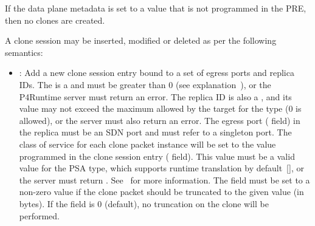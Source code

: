 \documentclass[11pt]{article}
\begin{document}
{%
If the  data plane metadata is set to a value that is not
programmed in the PRE, then no clones are created.%

A clone session may be inserted, modified or deleted as per the following
semantics:%

\begin{itemize}[noitemsep,topsep=\mdcompacttopsep]%

\item{}: Add a new clone session entry bound to a set of egress ports and
replica IDs. The  is a  and must be greater than 0 (see
explanation~), or the P4Runtime
server must return an  error. The replica  ID is
also a , and its value may not exceed the maximum allowed by the
target for the  type (0 is allowed), or the server must also
return an  error. The egress port ( field) in the
replica must be an SDN port and must refer to a singleton port. The class of
service for each clone packet instance will be set to the value programmed in
the clone session entry ( field). This value must be a valid
value for the PSA  type, which supports runtime translation
by default~[], or the server must return
. See~ for more information. The
 field must be set to a non-zero value if the clone
packet should be truncated to the given value (in bytes). If the
 field is 0 (default), no truncation on the clone will be
performed.%


\end{itemize}}
\end{document}
